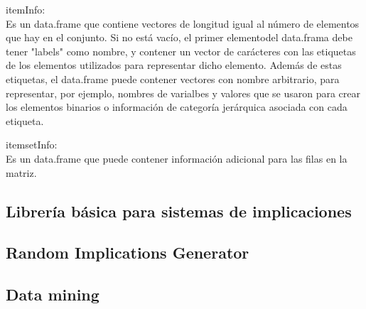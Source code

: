 itemInfo:\\
Es un data.frame que contiene vectores de longitud igual al n\'umero de elementos que 
hay en el conjunto. Si no est\'a vac\'io, el primer elementodel data.frama debe tener 
"labels" como nombre, y contener un vector de car\'acteres con las etiquetas de los 
elementos utilizados para representar dicho elemento. Adem\'as de estas etiquetas, el 
data.frame puede contener vectores con nombre arbitrario, para representar, por ejemplo, 
nombres de varialbes y valores que se usaron para crear los elementos binarios o 
informaci\'on de categor\'ia jer\'arquica asociada con cada etiqueta.


itemsetInfo:\\
Es un data.frame que puede contener informaci\'on adicional para las filas en la matriz.


















\subsection{Librer\'ia b\'asica para sistemas de implicaciones}


\subsection{Random Implications Generator}


\subsection{Data mining}




\newpage
\thispagestyle{empty}
\mbox{}

\newpage
